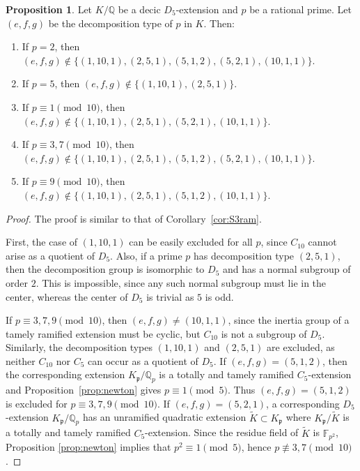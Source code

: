 \documentclass[letterpaper, 10pt]{article}
\newcommand{\bF}{\mathbb{F}}
\newcommand{\bQ}{\mathbb{Q}}
\newcommand{\frp}{\mathfrak{p}}
\newcommand{\1}{\mathds{1}}	%
\theoremstyle{definition}
\newtheorem{proposition}[theorem]{Proposition}
\theoremstyle{remark}
\begin{document}
\begin{proposition}
    \label{prop:D5ram}
    Let $K / \bQ$ be a decic $D_5$-extension and $p$ be a rational prime.
    Let $(e, f, g)$ be the decomposition type of $p$ in $K$. Then:
    \begin{enumerate}
        \item If $p = 2$, then $(e, f, g) \not \in \{(1, 10, 1), (2, 5, 1), (5, 1, 2), (5, 2, 1), (10, 1, 1)\}$.
        \item If $p = 5$, then $(e, f, g) \not\in \{(1, 10, 1), (2, 5, 1)\}$.
        \item If $p \equiv 1 \pmod{10}$, then $(e, f, g) \not \in \{(1, 10, 1), (2, 5, 1), (5, 2, 1), (10, 1, 1)\}$.
        \item If $p \equiv 3, 7 \pmod{10}$, then $(e, f, g) \not\in  \{(1, 10, 1), (2, 5, 1), (5, 1, 2), (5, 2, 1), (10, 1, 1)\}$.
        \item If $p \equiv 9 \pmod{10}$, then $(e, f, g) \not\in  \{(1, 10, 1), (2, 5, 1), (5, 1, 2), (10, 1, 1)\}$.
    \end{enumerate}
\end{proposition}
\begin{proof}

The proof is similar to that of Corollary~\ref{cor:S3ram}.  

First, the case of $(1, 10, 1)$ can be easily excluded for all $p$, since $C_{10}$ cannot arise as a quotient of $D_5$.
Also, if a prime $p$ has decomposition type $(2, 5, 1)$, then the decomposition group is isomorphic to $D_5$ and has a normal subgroup of order $2$. This is impossible, since any such normal subgroup must lie in the center, whereas the center of $D_5$ is trivial as $5$ is odd.


If \( p \equiv 3, 7, 9 \pmod{10} \), then \( (e, f, g) \ne (10, 1, 1) \), since the inertia group of a tamely ramified extension must be cyclic, but \( C_{10} \) is not a subgroup of \( D_5 \).  
Similarly, the decomposition types \( (1, 10, 1) \) and \( (2, 5, 1) \) are excluded, as neither \( C_{10} \) nor \( C_5 \) can occur as a quotient of \( D_5 \).
If \( (e, f, g) = (5, 1, 2) \), then the corresponding extension \( K_\mathfrak{p} / \mathbb{Q}_p \) is a totally and tamely ramified \( C_5 \)-extension and Proposition~\ref{prop:newton} gives $p \equiv 1 \pmod{5}$.
Thus \( (e, f, g) = (5, 1, 2) \) is excluded for $p \equiv 3, 7, 9 \pmod{10}$.
If $(e, f, g) = (5, 2, 1)$, a corresponding $D_5$-extension $K_\frp / \bQ_p$ has an unramified quadratic extension $\widetilde{K} \subset K_\frp$ where $K_\frp / \widetilde{K}$ is a totally and tamely ramified $C_5$-extension.
Since the residue field of $\widetilde{K}$ is $\bF_{p^2}$, Proposition \ref{prop:newton} implies that $p^2 \equiv 1 \pmod{5}$, hence $p \not\equiv 3, 7 \pmod{10}$.
\end{proof}
\end{document}
